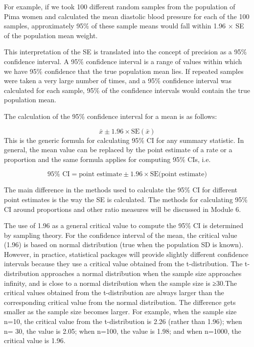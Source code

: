 \documentclass[
  a4paper,
]{memoir}
\begin{document}
For example, if we took 100 different random samples from the population
of Pima women and calculated the mean diastolic blood pressure for each
of the 100 samples, approximately 95\% of these sample means would fall
within 1.96 × SE of the population mean weight.

This interpretation of the SE is translated into the concept of
precision as a 95\% confidence interval. A 95\% confidence interval is a
range of values within which we have 95\% confidence that the true
population mean lies. If repeated samples were taken a very large number
of times, and a 95\% confidence interval was calculated for each sample,
95\% of the confidence intervals would contain the true population mean.

The calculation of the 95\% confidence interval for a mean is as
follows:

\[  \bar{x} \pm 1.96 \times \text{SE}( \bar{x} ) \] This is the generic
formula for calculating 95\% CI for any summary statistic. In general,
the mean value can be replaced by the point estimate of a rate or a
proportion and the same formula applies for computing 95\% CIs, i.e.

\[ 95\% \text{ CI} = \text{point estimate} \pm 1.96 \times \text{SE}(\text{point estimate)} \]

The main difference in the methods used to calculate the 95\% CI for
different point estimates is the way the SE is calculated. The methods
for calculating 95\% CI around proportions and other ratio measures will
be discussed in Module 6.

The use of 1.96 as a general critical value to compute the 95\% CI is
determined by sampling theory. For the confidence interval of the mean,
the critical value (1.96) is based on normal distribution (true when the
population SD is known). However, in practice, statistical packages will
provide slightly different confidence intervals because they use a
critical value obtained from the t-distribution. The t-distribution
approaches a normal distribution when the sample size approaches
infinity, and is close to a normal distribution when the sample size is
≥30.The critical values obtained from the t-distribution are always
larger than the corresponding critical value from the normal
distribution. The difference gets smaller as the sample size becomes
larger. For example, when the sample size n=10, the critical value from
the t-distribution is 2.26 (rather than 1.96); when n= 30, the value is
2.05; when n=100, the value is 1.98; and when n=1000, the critical value
is 1.96.
\end{document}
